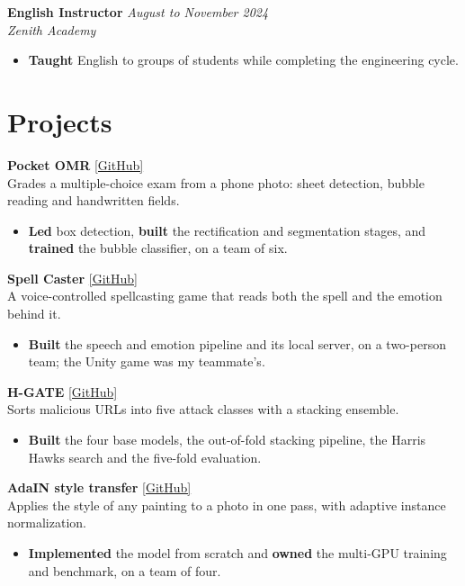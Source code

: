 \documentclass[10pt,a4paper]{article}
\begin{document}
\vspace{0.2em}
\textbf{English Instructor} \hfill \textit{August to November 2024} \\
\textit{Zenith Academy}
\begin{itemize}
    \item \textbf{Taught} English to groups of students while completing the engineering cycle.
\end{itemize}

\section{Projects}

\textbf{Pocket OMR} \hfill \href{https://github.com/pocket-omr}{[GitHub]}\\
Grades a multiple-choice exam from a phone photo: sheet detection, bubble reading and handwritten fields.
\begin{itemize}
    \item \textbf{Led} box detection, \textbf{built} the rectification and segmentation stages, and \textbf{trained} the bubble classifier, on a team of six.
\end{itemize}
\textbf{Spell Caster} \hfill \href{https://github.com/S4afou/spell-caster}{[GitHub]}\\
A voice-controlled spellcasting game that reads both the spell and the emotion behind it.
\begin{itemize}
    \item \textbf{Built} the speech and emotion pipeline and its local server, on a two-person team; the Unity game was my teammate's.
\end{itemize}
\textbf{H-GATE} \hfill \href{https://github.com/S4afou/h-gate}{[GitHub]}\\
Sorts malicious URLs into five attack classes with a stacking ensemble.
\begin{itemize}
    \item \textbf{Built} the four base models, the out-of-fold stacking pipeline, the Harris Hawks search and the five-fold evaluation.
\end{itemize}
\textbf{AdaIN style transfer} \hfill \href{https://github.com/S4afou/adain-style-transfer}{[GitHub]}\\
Applies the style of any painting to a photo in one pass, with adaptive instance normalization.
\begin{itemize}
    \item \textbf{Implemented} the model from scratch and \textbf{owned} the multi-GPU training and benchmark, on a team of four.
\end{itemize}
\end{document}
